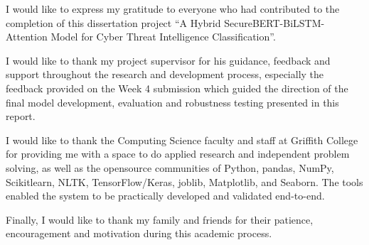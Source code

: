 \documentclass[12pt,a4paper]{report}
\begin{document}
I would like to express my gratitude to everyone who had contributed to the completion of this dissertation project “A Hybrid SecureBERT-BiLSTM-Attention Model for Cyber Threat Intelligence Classification”.

I would like to thank my project supervisor for his guidance, feedback and support throughout the research and development process, especially the feedback provided on the Week 4 submission which guided the direction of the final model development, evaluation and robustness testing presented in this report.

I would like to thank the Computing Science faculty and staff at Griffith College for providing me with a space to do applied research and independent problem solving, as well as the opensource communities of Python, pandas, NumPy, Scikitlearn, NLTK, TensorFlow/Keras, joblib, Matplotlib, and Seaborn. The tools enabled the system to be practically developed and validated end-to-end.

Finally, I would like to thank my family and friends for their patience, encouragement and motivation during this academic process.

\cleardoublepage
\tableofcontents
\cleardoublepage

\listoffigures
\cleardoublepage

\listoftables
\cleardoublepage









\end{document}
